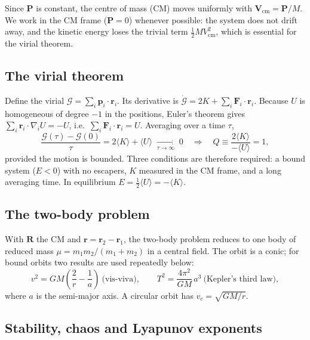 \documentclass[11pt,a4paper]{article}
\newcommand{\vect}[1]{\mathbf{#1}}
\begin{document}
Since $\vect P$ is constant, the centre of mass (CM) moves uniformly with
$\vect V_\text{cm}=\vect P/M$. We work in the CM frame ($\vect P=0$) whenever possible:
the system does not drift away, and the kinetic energy loses the trivial term
$\tfrac12 M V_\text{cm}^2$, which is essential for the virial theorem.

\subsection{The virial theorem}\label{sec:virial}

Define the virial $\mathcal G=\sum_i\vect p_i\cdot\vect r_i$. Its derivative is
$\dot{\mathcal G}=2K+\sum_i\vect F_i\cdot\vect r_i$. Because $U$ is homogeneous of degree
$-1$ in the positions, Euler's theorem gives $\sum_i\vect r_i\cdot\nabla_i U=-U$, i.e.\
$\sum_i\vect F_i\cdot\vect r_i=U$. Averaging over a time $\tau$,
\begin{equation}
  \frac{\mathcal G(\tau)-\mathcal G(0)}{\tau}=2\langle K\rangle+\langle U\rangle
  \;\xrightarrow[\tau\to\infty]{}\;0
  \quad\Longrightarrow\quad
  Q\equiv\frac{2\langle K\rangle}{-\langle U\rangle}=1,
  \label{eq:virial}
\end{equation}
provided the motion is bounded. Three conditions are therefore required: a bound system
($E<0$) with no escapers, $K$ measured in the CM frame, and a long averaging time. In
equilibrium $E=\tfrac12\langle U\rangle=-\langle K\rangle$.

\subsection{The two-body problem}

With $\vect R$ the CM and $\vect r=\vect r_2-\vect r_1$, the two-body problem reduces to
one body of reduced mass $\mu=m_1m_2/(m_1+m_2)$ in a central field. The orbit is a conic;
for bound orbits two results are used repeatedly below:
\begin{equation}
  v^2=GM\left(\frac{2}{r}-\frac1a\right)\ \text{(vis-viva)},\qquad
  T^2=\frac{4\pi^2}{GM}\,a^3\ \text{(Kepler's third law)},
\end{equation}
where $a$ is the semi-major axis. A circular orbit has $v_c=\sqrt{GM/r}$.

\subsection{Stability, chaos and Lyapunov exponents}\label{sec:chaos}
\end{document}
